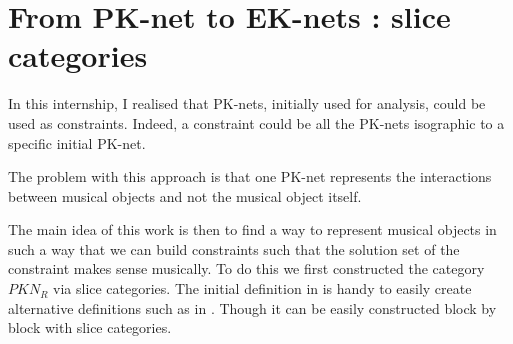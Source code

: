 \section{From PK-net to EK-nets : slice categories}
In this internship, I realised that PK-nets, initially used for analysis, could be used as constraints. Indeed, a constraint could be all the PK-nets isographic to a specific initial PK-net.

The problem with this approach is that one PK-net represents the interactions between musical objects and not the musical object itself.

The main idea of this work is then to find a way to represent musical objects in such a way that we can build constraints such that the solution set of the constraint makes sense musically. To do this we first constructed the category $PKN_R$ via slice categories. The initial definition in \cite{popoff2015categorical} is handy to easily create alternative definitions such as in \cite{popoff2016relational}. Though it can be easily constructed block by block with slice categories.


